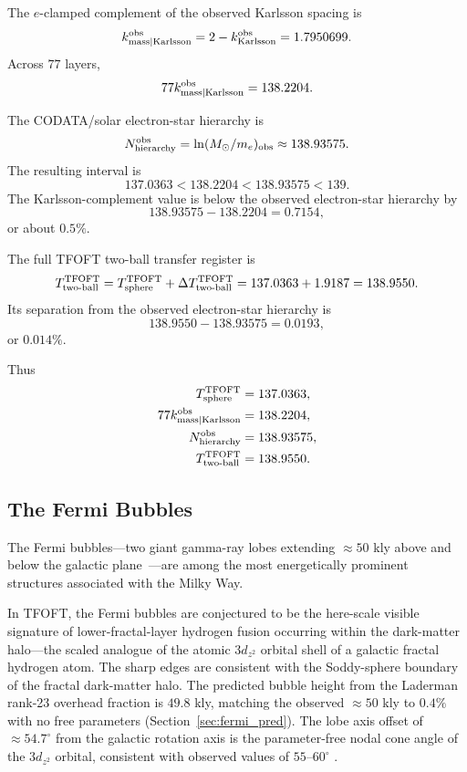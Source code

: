 \documentclass[11pt,a4paper]{article}
\begin{document}
The \(e\)-clamped complement of the observed Karlsson spacing is
\[
k_{\rm mass|Karlsson}^{\rm obs}
=
2-k_{\rm Karlsson}^{\rm obs}
=
1.7950699.
\]
Across \(77\) layers,
\[
77k_{\rm mass|Karlsson}^{\rm obs}
=
138.2204.
\]

The CODATA/solar electron-star hierarchy is
\[
N_{\rm hierarchy}^{\rm obs}
=
\ln(M_\odot/m_e)_{\rm obs}
\approx
138.93575.
\]
The resulting interval is
\[
137.0363
<
138.2204
<
138.93575
<
139.
\]
The Karlsson-complement value is below the observed electron-star hierarchy by
\[
138.93575-138.2204=0.7154,
\]
or about \(0.5\%\).

The full TFOFT two-ball transfer register is
\[
T_{\rm two\text{-}ball}^{\rm TFOFT}
=
T_{\rm sphere}^{\rm TFOFT}
+
\Delta T_{\rm two\text{-}ball}^{\rm TFOFT}
=
137.0363+1.9187
=
138.9550.
\]
Its separation from the observed electron-star hierarchy is
\[
138.9550-138.93575=0.0193,
\]
or \(0.014\%\).

Thus
\[
\begin{aligned}
T_{\rm sphere}^{\rm TFOFT} &= 137.0363,\\
77k_{\rm mass|Karlsson}^{\rm obs} &= 138.2204,\\
N_{\rm hierarchy}^{\rm obs} &= 138.93575,\\
T_{\rm two\text{-}ball}^{\rm TFOFT} &= 138.9550.
\end{aligned}
\]

\subsection{The Fermi Bubbles}

The Fermi bubbles---two giant gamma-ray lobes extending $\approx50$ kly above and below the galactic plane~\cite{Su2010,Ackermann2014}---are among the most energetically prominent structures associated with the Milky Way.

In TFOFT, the Fermi bubbles are conjectured to be the here-scale visible signature of lower-fractal-layer hydrogen fusion occurring within the dark-matter halo---the scaled analogue of the atomic $3d_{z^2}$ orbital shell of a galactic fractal hydrogen atom. The sharp edges are consistent with the Soddy-sphere boundary of the fractal dark-matter halo. The predicted bubble height from the Laderman rank-23 overhead fraction is $49.8$ kly, matching the observed $\approx50$ kly to $0.4\%$ with no free parameters (Section~\ref{sec:fermi_pred}). The lobe axis offset of $\approx54.7^\circ$ from the galactic rotation axis is the parameter-free nodal cone angle of the $3d_{z^2}$ orbital, consistent with observed values of $55$--$60^\circ$ \cite{Su2010,Dobler2010,Ackermann2014,Sarkar2015}.
\end{document}
